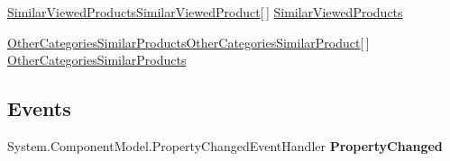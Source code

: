 \begin{DoxyCompactItemize}
\begin{DoxyCompactList}\small\item\em \end{DoxyCompactList}\item 
\hypertarget{class_price___comparison_1_1amazon_1_1ecs_1_1_cart_a2106db664c7053c41ec7fc7b8cd54830}{\hyperlink{class_price___comparison_1_1amazon_1_1ecs_1_1_similar_viewed_products_similar_viewed_product}{Similar\-Viewed\-Products\-Similar\-Viewed\-Product}\mbox{[}$\,$\mbox{]} \hyperlink{class_price___comparison_1_1amazon_1_1ecs_1_1_cart_a2106db664c7053c41ec7fc7b8cd54830}{Similar\-Viewed\-Products}}\label{class_price___comparison_1_1amazon_1_1ecs_1_1_cart_a2106db664c7053c41ec7fc7b8cd54830}

\begin{DoxyCompactList}\small\item\em \end{DoxyCompactList}\item 
\hypertarget{class_price___comparison_1_1amazon_1_1ecs_1_1_cart_a4b90894d85cd7c7d97ba522769acbd03}{\hyperlink{class_price___comparison_1_1amazon_1_1ecs_1_1_other_categories_similar_products_other_categories_similar_product}{Other\-Categories\-Similar\-Products\-Other\-Categories\-Similar\-Product}\mbox{[}$\,$\mbox{]} \hyperlink{class_price___comparison_1_1amazon_1_1ecs_1_1_cart_a4b90894d85cd7c7d97ba522769acbd03}{Other\-Categories\-Similar\-Products}}\label{class_price___comparison_1_1amazon_1_1ecs_1_1_cart_a4b90894d85cd7c7d97ba522769acbd03}

\begin{DoxyCompactList}\small\item\em \end{DoxyCompactList}\end{DoxyCompactItemize}
\subsection*{Events}
\begin{DoxyCompactItemize}
\item 
\hypertarget{class_price___comparison_1_1amazon_1_1ecs_1_1_cart_a418f0cde1aec048fae2380d03f80887f}{System.\-Component\-Model.\-Property\-Changed\-Event\-Handler {\bfseries Property\-Changed}}\label{class_price___comparison_1_1amazon_1_1ecs_1_1_cart_a418f0cde1aec048fae2380d03f80887f}

\end{DoxyCompactItemize}
